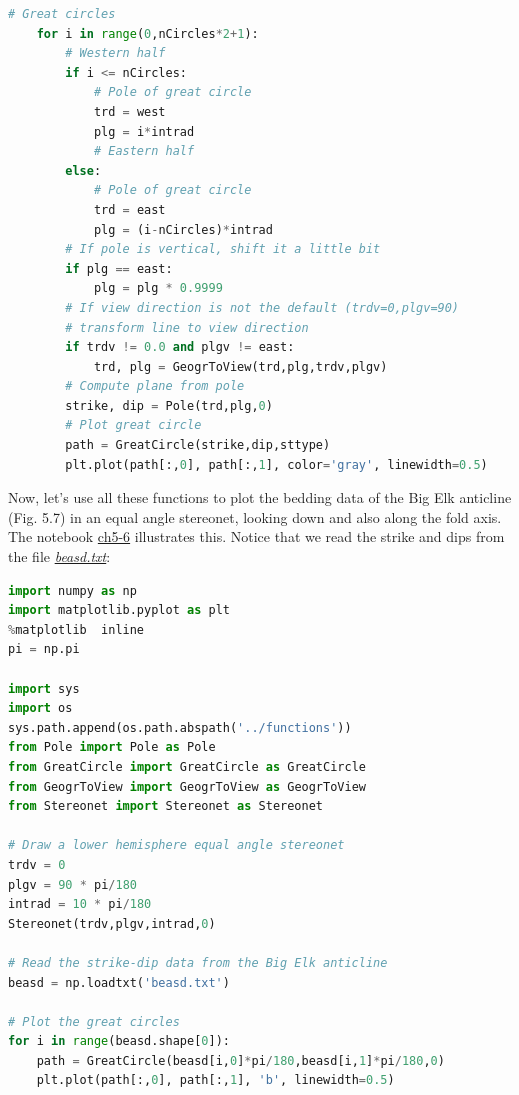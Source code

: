 \documentclass[a4paper , 12pt]{book}
\begin{document}
\begin{lstlisting}[language=Python, frame=single]
    # Great circles
    for i in range(0,nCircles*2+1):
        # Western half
        if i <= nCircles:
            # Pole of great circle
            trd = west
            plg = i*intrad
            # Eastern half
        else:
            # Pole of great circle
            trd = east
            plg = (i-nCircles)*intrad
        # If pole is vertical, shift it a little bit
        if plg == east:
            plg = plg * 0.9999
        # If view direction is not the default (trdv=0,plgv=90)
        # transform line to view direction
        if trdv != 0.0 and plgv != east:
            trd, plg = GeogrToView(trd,plg,trdv,plgv)
        # Compute plane from pole
        strike, dip = Pole(trd,plg,0)
        # Plot great circle
        path = GreatCircle(strike,dip,sttype)
        plt.plot(path[:,0], path[:,1], color='gray', linewidth=0.5)
\end{lstlisting}

Now, let's use all these functions to plot the bedding data of the Big Elk anticline (Fig. 5.7) in an equal angle stereonet, looking down and also along the fold axis. The notebook \href{https://github.com/nfcd/compGeo/blob/master/source/notebooks/ch5-6.ipynb}{ch5-6} illustrates this. Notice that we read the strike and dips from the file \href{https://github.com/nfcd/compGeo/blob/master/source/data/ch5-6/beasd.txt}{\textit{beasd.txt}}:

\begin{center}
\begin{lstlisting}[language=Python, frame=single]
import numpy as np
import matplotlib.pyplot as plt
%matplotlib  inline
pi = np.pi

import sys
import os
sys.path.append(os.path.abspath('../functions'))
from Pole import Pole as Pole
from GreatCircle import GreatCircle as GreatCircle
from GeogrToView import GeogrToView as GeogrToView
from Stereonet import Stereonet as Stereonet

# Draw a lower hemisphere equal angle stereonet
trdv = 0
plgv = 90 * pi/180
intrad = 10 * pi/180
Stereonet(trdv,plgv,intrad,0)

# Read the strike-dip data from the Big Elk anticline
beasd = np.loadtxt('beasd.txt')

# Plot the great circles
for i in range(beasd.shape[0]):
    path = GreatCircle(beasd[i,0]*pi/180,beasd[i,1]*pi/180,0)
    plt.plot(path[:,0], path[:,1], 'b', linewidth=0.5) 
\end{lstlisting}
\end{center}
\end{document}

